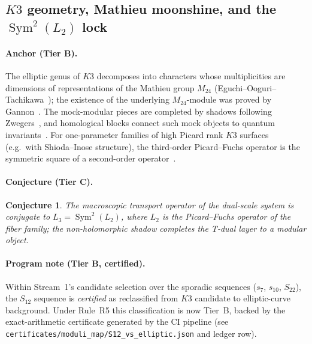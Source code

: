 \documentclass[11pt,a4paper]{article}
\theoremstyle{plain}
\newtheorem{conjecture}{Conjecture}
\theoremstyle{definition}
\theoremstyle{remark}
\newcommand{\tierB}{\textbf{Tier B}}
\newcommand{\tierC}{\textbf{Tier C}}
\begin{document}
\subsection{$K3$ geometry, Mathieu moonshine, and the
$\operatorname{Sym}^{2}(L_{2})$ lock}\label{sec:k3}

\paragraph{Anchor (\tierB{}).} The elliptic genus of $K3$ decomposes into
characters whose multiplicities are dimensions of representations of the
Mathieu group $M_{24}$ (Eguchi--Ooguri--Tachikawa~\cite{EOT2011}); the
existence of the underlying $M_{24}$-module was proved by
Gannon~\cite{Gannon2016}. The mock-modular pieces are completed by shadows
following Zwegers~\cite{Zwegers2002}, and homological blocks connect such
mock objects to quantum invariants~\cite{GPPV2020}. For one-parameter
families of high Picard rank $K3$ surfaces (e.g.\ with Shioda--Inose
structure), the third-order Picard--Fuchs operator is the symmetric square
of a second-order operator~\cite{Doran2000}.

\paragraph{Conjecture (\tierC{}).}
\begin{conjecture}\label{conj:lock}
The macroscopic transport operator of the dual-scale system is conjugate to
$L_{3}=\operatorname{Sym}^{2}(L_{2})$, where $L_{2}$ is the Picard--Fuchs
operator of the fiber family; the non-holomorphic shadow completes the
T-dual layer to a modular object.
\end{conjecture}

\paragraph{Program note (\tierB{}, certified).} Within Stream~1's
candidate selection over the sporadic sequences ($s_{7}$, $s_{10}$,
$S_{22}$), the $S_{12}$ sequence is \emph{certified} as reclassified from
$K3$ candidate to elliptic-curve background. Under Rule~R5 this
classification is now Tier~B, backed by the exact-arithmetic certificate
generated by the CI pipeline (see \texttt{certificates/moduli\_map/S12\_vs\_elliptic.json} and ledger row).
\end{document}
